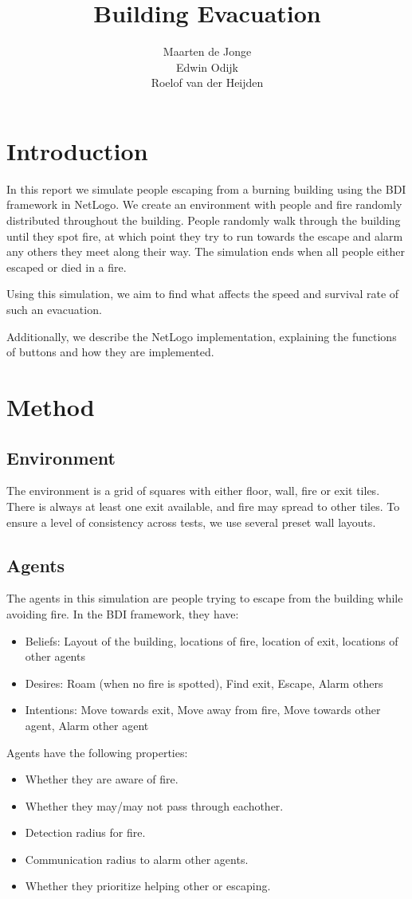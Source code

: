 \documentclass[a4paper]{article}
\title{Building Evacuation}
\author{Maarten de Jonge \\
        Edwin Odijk \\
        Roelof van der Heijden}
\begin{document}
\maketitle

\section{Introduction}
In this report we simulate people escaping from a burning building using the BDI framework in NetLogo. We create an environment with people and fire randomly distributed throughout the building. People randomly walk through the building until they spot fire, at which point they try to run towards the escape and alarm any others they meet along their way. The simulation ends when all people either escaped or died in a fire.

Using this simulation, we aim to find what affects the speed and survival rate of such an evacuation.

Additionally, we describe the NetLogo implementation, explaining the functions of buttons and how they are implemented.

\section{Method}

\subsection{Environment}
The environment is a grid of squares with either floor, wall, fire or exit tiles. There is always at least one exit available, and fire may spread to other tiles. To ensure a level of consistency across tests, we use several preset wall layouts.

\subsection{Agents}
The agents in this simulation are people trying to escape from the building while avoiding fire. In the BDI framework, they have:
\begin{itemize}
\item Beliefs: Layout of the building, locations of fire, location of exit, locations of other agents
\item Desires: Roam (when no fire is spotted), Find exit, Escape, Alarm others
\item Intentions: Move towards exit, Move away from fire, Move towards other agent, Alarm other agent
\end{itemize}
Agents have the following properties:
\begin{itemize}
\item Whether they are aware of fire.
\item Whether they may/may not pass through eachother.
\item Detection radius for fire.
\item Communication radius to alarm other agents.
\item Whether they prioritize helping other or escaping.
\end{itemize}
\end{document}
